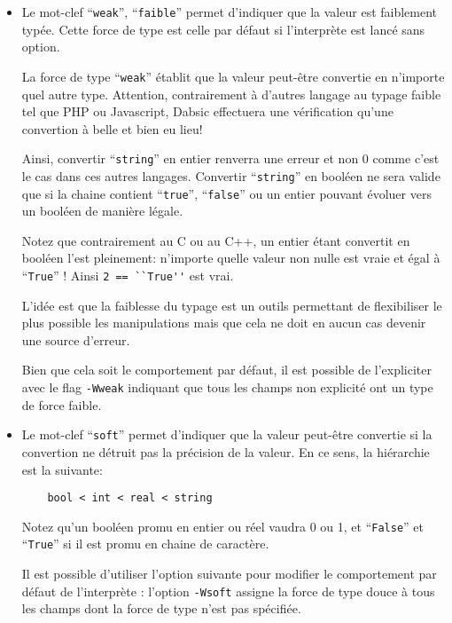 \documentclass[a5paper, 12pt]{book}
\begin{document}
\begin{itemize}
  \item Le mot-clef ``\verb!weak!'', ``\verb!faible!'' permet d'indiquer que la valeur est
    faiblement typée. Cette force de type est celle par défaut si
    l'interprète est lancé sans option.

    La force de type ``\verb!weak!'' établit que la valeur peut-être
    convertie en n'importe quel autre type. Attention, contrairement
    à d'autres langage au typage faible tel que PHP ou Javascript,
    Dabsic effectuera une vérification qu'une convertion à belle et bien
    eu lieu!

    Ainsi, convertir ``\verb!string!'' en entier renverra une erreur
    et non 0 comme c'est le cas dans ces autres langages. Convertir
    ``\verb!string!'' en booléen ne sera valide que si la chaine contient
    ``\verb!true!'', ``\verb!false!'' ou un entier pouvant évoluer vers un booléen
    de manière légale.

    Notez que contrairement au C ou au C++, un entier étant convertit
    en booléen l'est pleinement: n'importe quelle valeur non nulle
    est vraie et égal à ``\verb!True!'' ! Ainsi \verb!2 == ``True''! est vrai.

    L'idée est que la faiblesse du typage est un outils permettant
    de flexibiliser le plus possible les manipulations mais que
    cela ne doit en aucun cas devenir une source d'erreur.

    Bien que cela soit le comportement par défaut, il est possible de
    l'expliciter avec le flag \verb!-Wweak! indiquant que tous les champs
    non explicité ont un type de force faible.
    \vspace{\baselineskip}

  \item Le mot-clef ``\verb!soft!'' permet d'indiquer que la valeur peut-être
    convertie si la convertion ne détruit pas la précision de la valeur.
    En ce sens, la hiérarchie est la suivante:

\begin{verbatim}
    bool < int < real < string
\end{verbatim}

    Notez qu'un booléen promu en entier ou réel vaudra 0 ou 1, et
    ``\verb!False!'' et ``\verb!True!'' si il est promu en chaine de caractère.

    Il est possible d'utiliser l'option suivante pour
    modifier le comportement par défaut de l'interprète : l'option \verb!-Wsoft!
    assigne la force de type douce à tous les champs dont la force de
    type n'est pas spécifiée.
    \vspace{\baselineskip}


\end{itemize}
\end{document}
